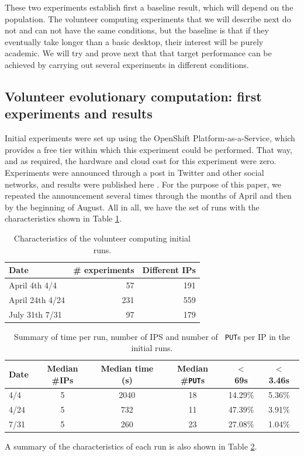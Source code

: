 \documentclass[journal,onecolumn]{IEEEtran}
\begin{document}
These two experiments establish first a baseline result, which will
depend on the population. The volunteer computing experiments that we
will describe next do not and can not have the same conditions, but
the baseline is that if they eventually take longer than a basic
desktop, their interest will be purely academic. We will try and
prove next that that target performance can be achieved by carrying
out several experiments in different conditions.

\subsection{Volunteer evolutionary computation: first experiments and results}

Initial experiments were set up using the OpenShift
Platform-as-a-Service, which provides a free tier within which this
experiment could be performed. That way, and as required, the hardware
and cloud cost for this experiment were zero. Experiments were
announced through a post in Twitter and other social networks, and
results were published here \cite{DBLP:conf/gecco/GuervosG15}. For the
purpose of this paper, we repeated the announcement several times
through the months of April and then by the beginning of August. All
in all, we have the set of runs with the characteristics shown in
Table \ref{tab:runs}.
%
\begin{table}
\caption{Characteristics of the volunteer computing initial runs. \label{tab:runs}}
\begin{center}
\begin{tabular}{l|rr}
\hline
Date & \# experiments & Different IPs \\
\hline 
April 4th 4/4 & 57 & 191 \\
April 24th 4/24 &  231 & 559 \\
July 31th 7/31 & 97 & 179 \\
\hline 
\end{tabular}
\end{center}
\end{table}
%
\begin{table}
\caption{Summary of time per run, number of IPS and number of {\tt
    PUT}s per IP in the initial runs. \label{tab:summary}}
\begin{center}
\begin{tabular}{l|ccccc}
\hline
Date & Median \#IPs & Median time (s) & Median \#{\tt PUT}s & $<$ 69s & $<$ 3.46s \\
\hline 
4/4 & 5 & 2040 & 18 & 14.29\% & 5.36\% \\
4/24 &  5 & 732 & 11 & 47.39\% & 3.91\% \\
7/31 & 5 & 260 & 23 & 27.08\% & 1.04\%  \\
\hline 
\end{tabular}
\end{center}
\end{table}
%
A summary of the characteristics of each run is also shown in Table
\ref{tab:summary}. 
\end{document}
